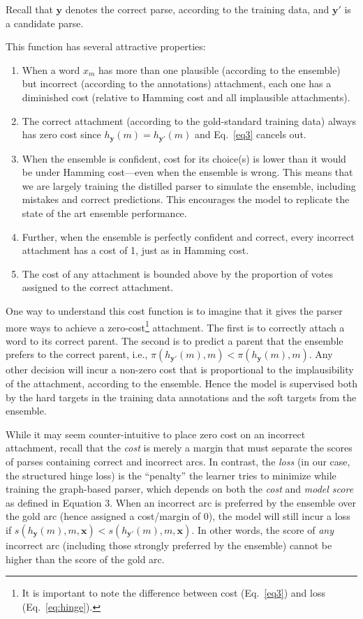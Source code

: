 \documentclass[11pt,letterpaper]{article}
\newcommand{\ignore}[1]{}
\newcommand{\nascomment}[1]{\ignore{\textcolor{blue}{{\textbf{[#1 --\textsc{nas}]}}}}}
\begin{document}
Recall that $\boldsymbol{y}$ denotes the correct parse, according to the training data, and $\boldsymbol{y'}$ is a candidate parse.

This function has several attractive properties:
\begin{enumerate}
\item When a word $x_m$ has more than one plausible (according to the ensemble) but incorrect (according to the annotations) attachment, each one has a diminished cost (relative to Hamming cost and all implausible attachments).
\item The correct attachment (according to the gold-standard training data) always has zero cost since $h_{\boldsymbol{y}}(m)=h_{\boldsymbol{y'}}(m)$ and Eq.~\ref{eq3} cancels out. \ignore{\nascomment{I may have misunderstood what you wrote}}
\item When the ensemble is confident, cost for its choice(s) is lower than it would be under Hamming cost---even when the ensemble is wrong.  This means that we are largely training the distilled parser to simulate the ensemble, including mistakes and correct predictions. This encourages the model to replicate the state of the art ensemble performance.
\item Further, when the ensemble is perfectly confident and correct, every incorrect attachment  has a cost of 1, just as in Hamming cost.
\item The cost of any attachment is bounded above by the proportion of votes assigned to the correct attachment.  \ignore{\nascomment{check}}
\end{enumerate}




One way to understand this cost function is to imagine that it gives the parser more ways to achieve a zero-cost\footnote{It is important to note the difference between cost (Eq.~\ref{eq3}) and loss (Eq.~\ref{eq:hinge}).} attachment.  The first is to correctly attach a word to its correct parent.  The second is to predict a parent that the ensemble prefers to the correct parent, i.e.,
$\pi(h_{\boldsymbol{y'}}(m), m) < \pi(h_{\boldsymbol{y}}(m), m)$. Any other decision will incur a non-zero cost that is proportional to the implausibility of the attachment, according to the ensemble. Hence the model is supervised both by the hard targets in the training data annotations and the soft targets from the ensemble.

While it may seem counter-intuitive to place zero cost on an incorrect attachment, recall that the \emph{cost} is merely a margin that must separate the scores of parses containing correct and incorrect arcs. In contrast, the \emph{loss} (in our case, the structured hinge loss) is the “penalty” the learner tries to minimize while training the graph-based parser, which depends on both the \emph{cost} and \emph{model score} as defined in Equation 3. When an incorrect arc is preferred by the ensemble over the gold arc (hence assigned a cost/margin of 0), the model will still incur a loss if $s(h_{\boldsymbol{y}}(m), m, \boldsymbol{x}) < s(h_{\boldsymbol{y'}}(m), m, \boldsymbol{x})$. In other words, the score of \emph{any} incorrect arc (including those strongly preferred by the ensemble) cannot be higher than the score of the gold arc. 
\end{document}
